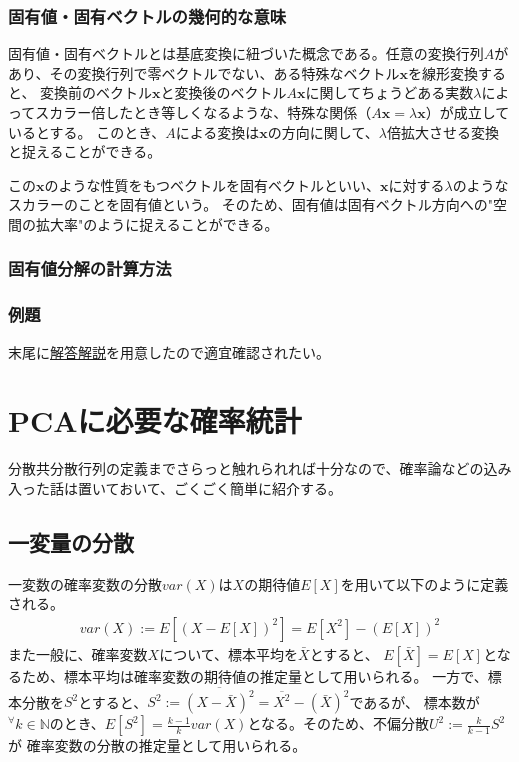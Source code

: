 \documentclass[10pt]{ujarticle}
\begin{document}
\subsubsection{固有値・固有ベクトルの幾何的な意味}
固有値・固有ベクトルとは基底変換に紐づいた概念である。任意の変換行列$A$があり、その変換行列で零ベクトルでない、ある特殊なベクトル$\mathbf{x}$を線形変換すると、
変換前のベクトル$\mathbf{x}$と変換後のベクトル$A\mathbf{x}$に関してちょうどある実数$\lambda$によってスカラー倍したとき等しくなるような、特殊な関係（$A\mathbf{x}=\lambda\mathbf{x}$）が成立しているとする。
このとき、$A$による変換は$\mathbf{x}$の方向に関して、$\lambda$倍拡大させる変換と捉えることができる。

この$\mathbf{x}$のような性質をもつベクトルを固有ベクトルといい、$\mathbf{x}$に対する$\lambda$のようなスカラーのことを固有値という。
そのため、固有値は固有ベクトル方向への"空間の拡大率"のように捉えることができる。

\subsubsection{固有値分解の計算方法}
\subsubsection{例題}
末尾に\hyperlink{q2}{解答解説}を用意したので適宜確認されたい。

\section{PCAに必要な確率統計}
分散共分散行列の定義までさらっと触れられれば十分なので、確率論などの込み入った話は置いておいて、ごくごく簡単に紹介する。

\subsection{一変量の分散}
一変数の確率変数の分散$var(X)$は$X$の期待値$E[X]$を用いて以下のように定義される。
$$
\begin{aligned}
  var(X):=E[(X-E[X])^2]=E[X^2]-(E[X])^2
\end{aligned}
$$
また一般に、確率変数$X$について、標本平均を$\bar{X}$とすると、
$E[\bar{X}]=E[X]$となるため、標本平均は確率変数の期待値の推定量として用いられる。
一方で、標本分散を$S^2$とすると、$S^2:=\overline{(X-\bar{X})^2}=\overline{X^2}-(\bar{X})^2$であるが、
標本数が$^\forall k\in\mathbb{N}$のとき、$E[S^2]=\frac{k-1}{k}var(X)$となる。そのため、不偏分散$U^2:=\frac{k}{k-1}S^2$が
確率変数の分散の推定量として用いられる。
\end{document}

